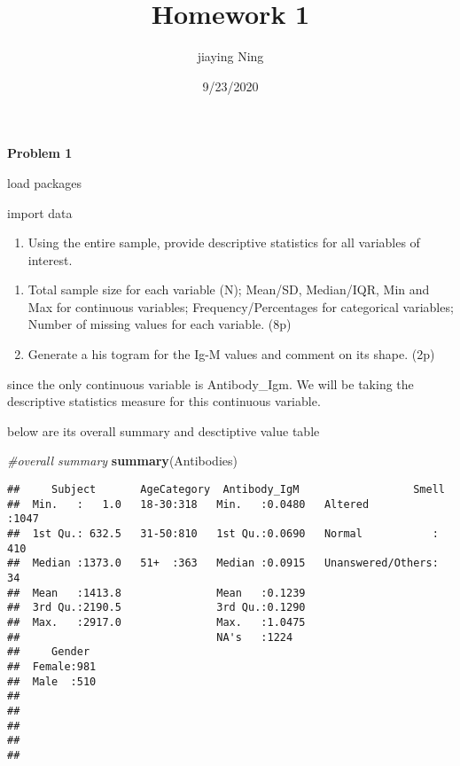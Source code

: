 \documentclass[]{article}
\title{Homework 1}
\author{jiaying Ning}
\date{9/23/2020}
\newenvironment{Shaded}{\begin{snugshade}}{\end{snugshade}}
\newcommand{\CommentTok}[1]{\textcolor[rgb]{0.56,0.35,0.01}{\textit{#1}}}
\newcommand{\KeywordTok}[1]{\textcolor[rgb]{0.13,0.29,0.53}{\textbf{#1}}}
\newcommand{\NormalTok}[1]{#1}
\providecommand{\tightlist}{%
  \setlength{\itemsep}{0pt}\setlength{\parskip}{0pt}}
\begin{document}
\maketitle

\textbf{Problem 1}

load packages

import data

\begin{enumerate}
\def\labelenumi{\arabic{enumi})}
\tightlist
\item
  Using the entire sample, provide descriptive statistics for all
  variables of interest.
\end{enumerate}

\begin{enumerate}
\def\labelenumi{\alph{enumi})}
\tightlist
\item
  Total sample size for each variable (N); Mean/SD, Median/IQR, Min and
  Max for continuous variables; Frequency/Percentages for categorical
  variables; Number of missing values for each variable. (8p)
\item
  Generate a his togram for the Ig-M values and comment on its shape.
  (2p)
\end{enumerate}

since the only continuous variable is Antibody\_Igm. We will be taking
the descriptive statistics measure for this continuous variable.

below are its overall summary and desctiptive value table

\begin{Shaded}
\begin{Highlighting}[]
\CommentTok{#overall summary}
\KeywordTok{summary}\NormalTok{(Antibodies)}
\end{Highlighting}
\end{Shaded}

\begin{verbatim}
##     Subject       AgeCategory  Antibody_IgM                  Smell     
##  Min.   :   1.0   18-30:318   Min.   :0.0480   Altered          :1047  
##  1st Qu.: 632.5   31-50:810   1st Qu.:0.0690   Normal           : 410  
##  Median :1373.0   51+  :363   Median :0.0915   Unanswered/Others:  34  
##  Mean   :1413.8               Mean   :0.1239                           
##  3rd Qu.:2190.5               3rd Qu.:0.1290                           
##  Max.   :2917.0               Max.   :1.0475                           
##                               NA's   :1224                             
##     Gender   
##  Female:981  
##  Male  :510  
##              
##              
##              
##              
## 
\end{verbatim}
\end{document}
